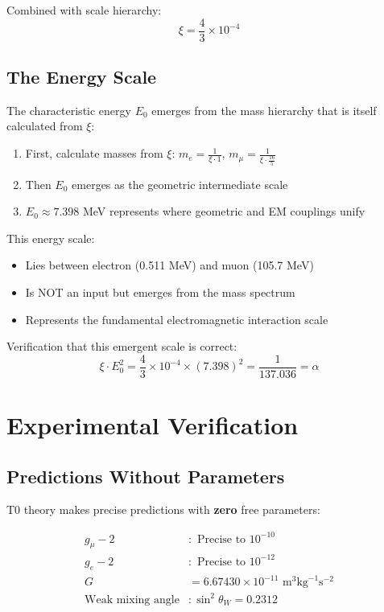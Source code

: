 \documentclass[12pt,a4paper]{article}
\theoremstyle{definition}
\begin{document}
	Combined with scale hierarchy:
	\begin{equation}
		\xi = \frac{4}{3} \times 10^{-4}
	\end{equation}
	
	\subsection{The Energy Scale}
	
	The characteristic energy $E_0$ emerges from the mass hierarchy that is itself calculated from $\xi$:
	
	\begin{enumerate}
		\item First, calculate masses from $\xi$: $m_e = \frac{1}{\xi \cdot 1}$, $m_\mu = \frac{1}{\xi \cdot \frac{16}{5}}$
		\item Then $E_0$ emerges as the geometric intermediate scale
		\item $E_0 \approx 7.398$ MeV represents where geometric and EM couplings unify
	\end{enumerate}
	
	This energy scale:
	\begin{itemize}
		\item Lies between electron (0.511 MeV) and muon (105.7 MeV) 
		\item Is NOT an input but emerges from the mass spectrum
		\item Represents the fundamental electromagnetic interaction scale
	\end{itemize}
	
	Verification that this emergent scale is correct:
	\begin{equation}
		\xi \cdot E_0^2 = \frac{4}{3} \times 10^{-4} \times (7.398)^2 = \frac{1}{137.036} = \alpha
	\end{equation}
	
	\section{Experimental Verification}
	
	\subsection{Predictions Without Parameters}
	
	T0 theory makes precise predictions with \textbf{zero} free parameters:
	
	\begin{fundamental}
		\begin{align}
			g_\mu - 2 &: \text{ Precise to } 10^{-10}\\
			g_e - 2 &: \text{ Precise to } 10^{-12}\\
			G &= 6.67430 \times 10^{-11} \text{ m}^3\text{kg}^{-1}\text{s}^{-2}\\
			\text{Weak mixing angle} &: \sin^2\theta_W = 0.2312
		\end{align}
	\end{fundamental}
	
\end{document}

